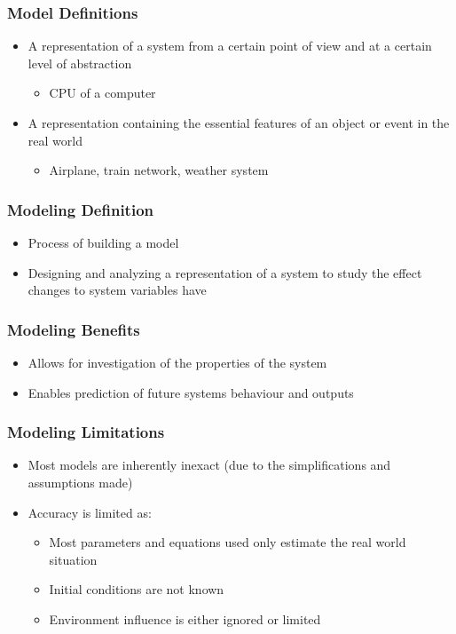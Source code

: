 \subsubsection{Model Definitions}
\begin{itemize}
	\item A representation of a system from a certain point of view
		and at a certain level of abstraction
	\begin{itemize}
		\item CPU of a computer
	\end{itemize}
	\item A representation containing the essential features of an
		object or event in the real world
	\begin{itemize}
		\item Airplane, train network, weather system
	\end{itemize}
\end{itemize}
\subsubsection{Modeling Definition}
\begin{itemize}
	\item Process of building a model
	\item Designing and analyzing a representation of a system to
		study the effect changes to system variables have
\end{itemize}

\subsubsection{Modeling Benefits}
\begin{itemize}
	\item Allows for investigation of the properties of the system
	\item Enables prediction of future systems behaviour and outputs
\end{itemize}

\subsubsection{Modeling Limitations}
\begin{itemize}
	\item Most models are inherently inexact (due to the
		simplifications and assumptions made)
	\item Accuracy is limited as:
	\begin{itemize}
		\item Most parameters and equations used only estimate
			the real world situation
		\item Initial conditions are not known
		\item Environment influence is either ignored or limited
	\end{itemize}
\end{itemize}

